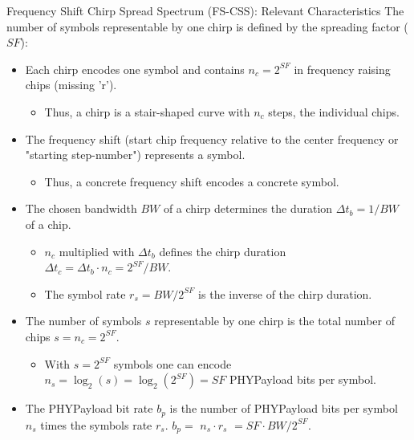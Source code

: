 \begin{frame}{\alert{Frequency Shift} Chirp Spread Spectrum (FS-CSS): Relevant Characteristics}
The \alert{number of symbols} representable by one chirp is defined by the \alert{spreading factor} ($SF$):
  \begin{itemize}
    \item \alert{Each chirp} encodes \alert{one symbol} and contains $n_c = 2^{SF}$ in frequency raising \alert{chips} (missing 'r').
    \begin{itemize}
      \item[$\Rightarrow$] Thus, a chirp is a \alert{stair-shaped curve} with \alert{$n_c$ steps}, the individual chips.
    \end{itemize}
    \item The \alert{frequency shift} (start chip frequency relative to the center frequency or "{}starting step-number"{}) represents a \alert{symbol}.
    \begin{itemize}
      \item[$\Rightarrow$] Thus, a \alert{concrete frequency shift} encodes a \alert{concrete symbol}.
    \end{itemize}
    \item The chosen \alert{bandwidth $BW$ of a chirp} determines the \alert{duration} $\Delta t_b = 1 / BW$ of a \alert{chip}.
    \begin{itemize}
      \item[$\Rightarrow$] $n_c$ multiplied with $\Delta t_b$ defines the \alert{chirp duration} $\Delta t_c = \Delta t_b \cdot n_c = 2^{SF} / BW$.
      \item[$\Rightarrow$] The \alert{symbol rate} $r_s = BW / 2^{SF}$ is the \alert{inverse of the chirp duration}.
    \end{itemize}
    \item The \alert{number of symbols} $s$ \alert{representable by one} chirp is the \alert{total number of chips} $s = n_c = 2^{SF}$.
    \begin{itemize}
      \item[$\Rightarrow$] With $s = 2^{SF}$ symbols one can encode \alert{$n_s = \log_2(s) = \log_2\left(2^{SF}\right)= SF$} PHYPayload \alert{bits per symbol}.
    \end{itemize}
    \item The \alert{PHYPayload bit rate} $b_p$ is the number of \alert{PHYPayload bits per symbol $n_s$} times the \alert{symbols rate $r_s$}. \textcolor{fh-ooe-red}{$b_p =$} $ n_s \cdot r_s$ \textcolor{fh-ooe-red}{$= SF \cdot BW / 2^{SF}$}.

\end{itemize}
\end{frame}
